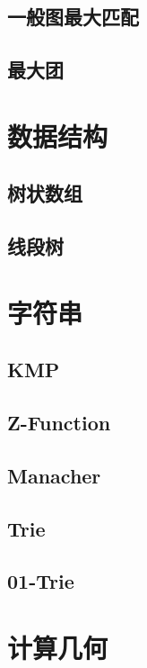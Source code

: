 \documentclass{article}
\begin{document}
\subsection{一般图最大匹配}

\subsection{最大团}


\section{数据结构}
\subsection{树状数组}

\subsection{线段树}
\section{字符串}
\subsection{KMP}

\subsection{Z-Function}

\subsection{Manacher}

\subsection{Trie}

\subsection{01-Trie}




\section{计算几何}

\end{document}

